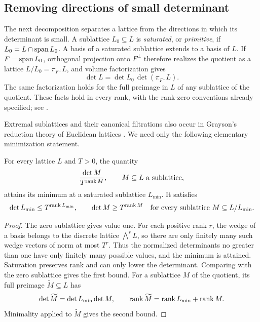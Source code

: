 \subsection{Removing directions of small determinant}

The next decomposition separates a lattice from the directions in
which its determinant is small. A sublattice
\(L_0\subseteq L\) is \emph{saturated}, or \emph{primitive}, if
\(L_0=L\cap\operatorname{span} L_0\). A basis of a saturated sublattice extends
to a basis of \(L\). If \(F=\operatorname{span} L_0\), orthogonal projection onto
\(F^\perp\) therefore realizes the quotient as a lattice
\(L/L_0=\pi_{F^\perp}L\), and volume factorization gives
\begin{equation}\label{eq:orthogonal-quotient}
 \det L=\det L_0\,\det(\pi_{F^\perp}L).
\end{equation}
The same factorization holds for the full preimage in \(L\) of any
sublattice of the quotient. These facts hold in every rank, with the
rank-zero conventions already specified; see
\cite[Lemma~3.1]{SymmetricRate}.

Extremal sublattices and their canonical filtrations also occur in
Grayson's reduction theory of Euclidean lattices
\cite[Section~1]{Grayson}. We need only the following elementary
minimization statement.

\begin{lemma}
\label{lem:minimizer}
For every lattice \(L\) and \(T>0\), the quantity
\[
 \frac{\det M}{T^{\operatorname{rank} M}},\qquad M\subseteq L\text{ a sublattice},
\]
attains its minimum at a saturated sublattice \(L_{\min}\). It satisfies
\[
 \det L_{\min}\le T^{\operatorname{rank} L_{\min}},\qquad
 \det M\ge T^{\operatorname{rank} M}
 \quad\text{for every sublattice }M\subseteq L/L_{\min}.
\]
\end{lemma}

\begin{proof}
The zero sublattice gives value one. For each positive rank \(r\), the
wedge of a basis belongs to the discrete lattice \(\bigwedge^r L\),
so there are only finitely many such wedge vectors of norm at most
\(T^r\). Thus the normalized determinants no greater than one have
only finitely many possible values, and the minimum is attained.
Saturation preserves rank and can only lower the determinant. Comparing
with the zero sublattice gives the first bound. For a sublattice \(M\)
of the quotient, its full preimage \(\widetilde M\subseteq L\) has
\[
 \det\widetilde M=\det L_{\min}\det M,
 \qquad
 \operatorname{rank}\widetilde M=\operatorname{rank} L_{\min}+\operatorname{rank} M.
\]
Minimality applied to \(\widetilde M\) gives the second bound.
\end{proof}

